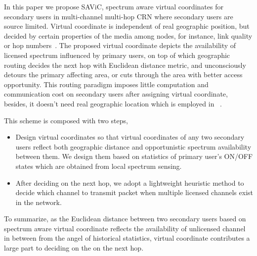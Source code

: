 In this paper we propose SAViC, spectrum aware virtual coordinates for secondary users in multi-channel multi-hop CRN where secondary users are source limited.
Virtual coordinate is independent of real geographic position, but decided by certain properties of the media among nodes, for instance, link quality or hop numbers~\cite{gpsfree05infocom}.
The proposed virtual coordinate depicts the availability of licensed spectrum influenced by primary users, on top of which geographic routing decides the next hop with Euclidean distance metric, and unconsciously detours the primary affecting area, or cuts through the area with better access opportunity.
This routing paradigm imposes little computation and communication cost on secondary users after assigning virtual coordinate, besides, it doesn't need real geographic location which is employed in ~\cite{search_geo_routing_chowdhury, routing-crn-jsac12}.

This scheme is composed with two steps,
\begin{itemize}
\item Design virtual coordinates so that virtual coordinates of any two secondary users reflect both geographic distance and opportunistic spectrum availability between them.
We design them based on statistics of primary user’s ON/OFF states which are obtained from local spectrum sensing.

\item After deciding on the next hop, we adopt a lightweight heuristic method to decide which channel to transmit packet when multiple licensed channels exist in the network.


\end{itemize}

To summarize, as the Euclidean distance between two secondary users based on spectrum aware virtual coordinate reflects the availability of unlicensed channel in between from the angel of historical statistics, virtual coordinate contributes a large part to deciding on the on the next hop. 




